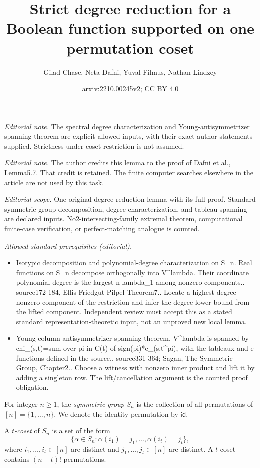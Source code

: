 \documentclass[10pt,a4paper]{article}
\title{Strict degree reduction for a Boolean function supported on one permutation coset}
\author{Gilad Chase, Neta Dafni, Yuval Filmus, Nathan Lindzey}
\date{arxiv:2210.00245v2; CC BY 4.0}
\theoremstyle{definition}
\providecommand{\id}{\mathsf{id}}
\begin{document}
\maketitle
\noindent\textit{Editorial note.} The spectral degree characterization and Young-antisymmetrizer spanning theorem are explicit allowed inputs, with their exact author statements supplied. Strictness under coset restriction is not assumed.\par\medskip
\noindent\textit{Editorial note.} The author credits this lemma to the proof of Dafni et al., Lemma5.7. That credit is retained. The finite computer searches elsewhere in the article are not used by this task.\par\medskip
\noindent\textit{Editorial scope.} One original degree-reduction lemma with its full proof. Standard symmetric-group decomposition, degree characterization, and tableau spanning are declared inputs. No2-intersecting-family extremal theorem, computational finite-case verification, or perfect-matching analogue is counted.\par\medskip
\noindent\textit{Allowed standard prerequisites (editorial).}\begin{itemize}
\item Isotypic decomposition and polynomial-degree characterization on S\_n. Real functions on S\_n decompose orthogonally into V\textasciicircum{}lambda. Their coordinate polynomial degree is the largest n-lambda\_1 among nonzero components.. source172-184, Ellis-Friedgut-Pilpel Theorem7.. Locate a highest-degree nonzero component of the restriction and infer the degree lower bound from the lifted component. Independent review must accept this as a stated standard representation-theoretic input, not an unproved new local lemma.
\item Young column-antisymmetrizer spanning theorem. V\textasciicircum{}lambda is spanned by chi\_(s,t)=sum over pi in C(t) of sign(pi)*e\_(s,t\textasciicircum{}pi), with the tableaux and e-functions defined in the source.. source331-364; Sagan, The Symmetric Group, Chapter2.. Choose a witness with nonzero inner product and lift it by adding a singleton row. The lift/cancellation argument is the counted proof obligation.
\end{itemize}\medskip
For integer $n \geq 1$, the \emph{symmetric group} $S_n$ is the collection of all permutations of $[n] = \{1,\ldots,n\}$. We denote the identity permutation by $\id$.

A \emph{$t$-coset} of $S_n$ is a set of the form
\[
 \{ \alpha \in S_n : \alpha(i_1) = j_1, \ldots, \alpha(i_t) = j_t \},
\]
where $i_1,\ldots,i_t \in [n]$ are distinct and $j_1,\ldots,j_t \in [n]$ are distinct. A $t$-coset contains $(n-t)!$ permutations.
\end{document}
